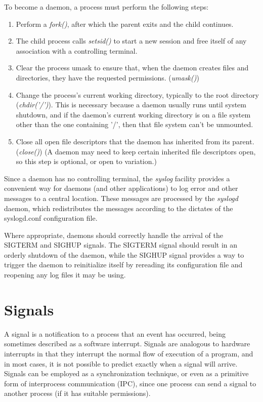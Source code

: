 To become a daemon, a process must perform the following steps:
\begin{enumerate}
	\item Perform a \textit{fork()}, after which the parent exits and the child continues.
	\item The  child  process  calls  \textit{setsid()} to  start  a  new  session  and  free itself of any association with a controlling terminal.
	\item Clear the process umask to ensure that, when the daemon creates files and directories, they have the requested permissions. (\textit{umask()})
	\item Change the process’s current working directory, typically to the root directory (\textit{chdir('/')}). This is necessary because a daemon usually runs until system shutdown, and if the daemon’s current working directory is on a file system other than the one containing '/', then that file system can’t be unmounted.
	\item Close  all  open file descriptors that the daemon has inherited  from its parent. (\textit{close()}) (A  daemon  may  need  to  keep  certain  inherited  file  descriptors  open,  so  this step  is  optional,  or  open  to  variation.)
\end{enumerate}

Since a daemon has no controlling terminal, the  \textit{syslog}  facility  provides  a  convenient  way  for  daemons  (and  other  applications)  to  log  error  and  other  messages  to  a  central  location.  These  messages  are processed by the \textit{syslogd} daemon, which redistributes the messages according to the dictates  of  the  syslogd.conf  configuration  file. 

Where appropriate, daemons should correctly handle the arrival of the SIGTERM and SIGHUP  signals. The  SIGTERM signal  should  result  in  an  orderly  shutdown  of  the daemon, while the SIGHUP signal provides a way to trigger the daemon to reinitialize itself by rereading its configuration file and reopening any log files it may be using.

\clearpage
\section{Signals}

A signal is a notification to a process that an event has occurred, being sometimes described as a software interrupt. Signals are analogous to hardware interrupts in that they interrupt the normal flow of execution of a program, and in most cases, it is not possible to predict exactly when a signal will arrive. Signals can be employed as a synchronization technique, or even as a primitive form of interprocess communication (IPC), since one process can send a signal to another process (if it has suitable permissions). \cite{linux_progr_interface}

